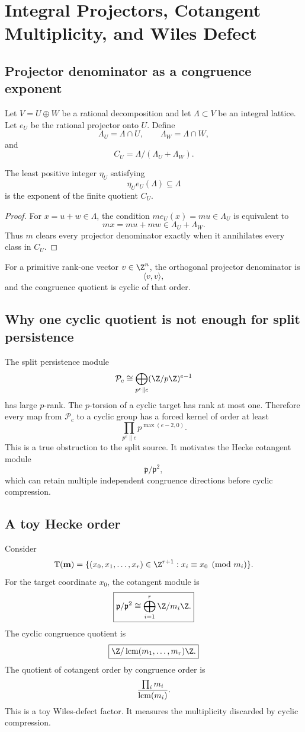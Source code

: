 \clearpage
\section{Integral Projectors, Cotangent Multiplicity, and Wiles Defect}

\subsection{Projector denominator as a congruence exponent}
Let $V=U\oplus W$ be a rational decomposition and let $\Lambda\subset V$ be an integral lattice. Let $e_U$ be the rational projector onto $U$. Define
\[
 \Lambda_U=\Lambda\cap U,
 \qquad
 \Lambda_W=\Lambda\cap W,
\]
and
\[
 C_U=\Lambda/(\Lambda_U+\Lambda_W).
\]

\begin{theorem}
The least positive integer $\eta_U$ satisfying
\[
 \eta_U e_U(\Lambda)\subseteq\Lambda
\]
is the exponent of the finite quotient $C_U$.
\end{theorem}

\begin{proof}
For $x=u+w\in\Lambda$, the condition $m e_U(x)=mu\in\Lambda_U$ is equivalent to
\[
 mx=mu+mw\in\Lambda_U+\Lambda_W.
\]
Thus $m$ clears every projector denominator exactly when it annihilates every class in $C_U$.
\end{proof}

For a primitive rank-one vector $v\in\Z^n$, the orthogonal projector denominator is
\[
 \langle v,v\rangle,
\]
and the congruence quotient is cyclic of that order.

\subsection{Why one cyclic quotient is not enough for split persistence}
The split persistence module
\[
 \mathcal P_c
 \cong
 \bigoplus_{p^e\parallel c}
 (\Z/p\Z)^{e-1}
\]
has large $p$-rank. The $p$-torsion of a cyclic target has rank at most one. Therefore every map from $\mathcal P_c$ to a cyclic group has a forced kernel of order at least
\[
 \prod_{p^e\parallel c}p^{\max(e-2,0)}.
\]
This is a true obstruction to the split source. It motivates the Hecke cotangent module
\[
 \mathfrak p/\mathfrak p^2,
\]
which can retain multiple independent congruence directions before cyclic compression.

\subsection{A toy Hecke order}
Consider
\[
 \mathbb T(\mathbf m)
 =
 \{(x_0,x_1,\ldots,x_r)\in\Z^{r+1}:x_i\equiv x_0\pmod{m_i}\}.
\]
For the target coordinate $x_0$, the cotangent module is
\[
 \boxed{
 \mathfrak p/\mathfrak p^2
 \cong
 \bigoplus_{i=1}^{r}\Z/m_i\Z.
 }
\]
The cyclic congruence quotient is
\[
 \boxed{
 \Z/\lcm(m_1,\ldots,m_r)\Z.
 }
\]
The quotient of cotangent order by congruence order is
\[
 \frac{\prod_i m_i}{\operatorname{lcm}(m_i)}.
\]
This is a toy Wiles-defect factor. It measures the multiplicity discarded by cyclic compression.

